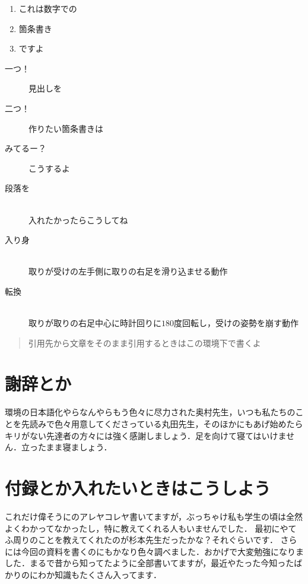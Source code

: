 \documentclass{jlreq}%
\numberwithin{equation}{section}%
\begin{document}
\begin{enumerate}
    \item これは数字での
    \item 箇条書き
    \item ですよ
\end{enumerate}

\begin{description}
    \item[一つ！] 見出しを
    \item[二つ！] 作りたい箇条書きは
    \item[みてるー？] こうするよ
    \item[段落を]\mbox{}\\
          入れたかったらこうしてね
    \item[入り身]\mbox{}\\
          取りが受けの左手側に取りの右足を滑り込ませる動作
    \item[転換]\mbox{}\\
          取りが取りの右足中心に時計回りに$180$度回転し，受けの姿勢を崩す動作
\end{description}



\begin{quotation}
    引用先から文章をそのまま引用するときはこの環境下で書くよ
\end{quotation}


\section*{謝辞とか}

\LaTeXe 環境の日本語化やらなんやらもう色々に尽力された奥村先生\cite{okumura7th}，いつも私たちのことを先読みで色々用意してくださっている丸田先生，そのほかにもあげ始めたらキリがない先達者の方々には強く感謝しましょう．足を向けて寝てはいけません．立ったまま寝ましょう．

\appendix
\section{付録とか入れたいときはこうしよう}

これだけ偉そうに\LaTeXe のアレヤコレヤ書いてますが，ぶっちゃけ私も学生の頃は全然よくわかってなかったし，特に教えてくれる人もいませんでした．
最初にやてふ周りのことを教えてくれたのが杉本先生だったかな？それぐらいです．
さらには今回の資料を書くのにもかなり色々調べました．おかげで大変勉強になりました．まるで昔から知ってたように全部書いてますが，最近やたった今知ったばかりのにわか知識もたくさん入ってます．
\end{document}
